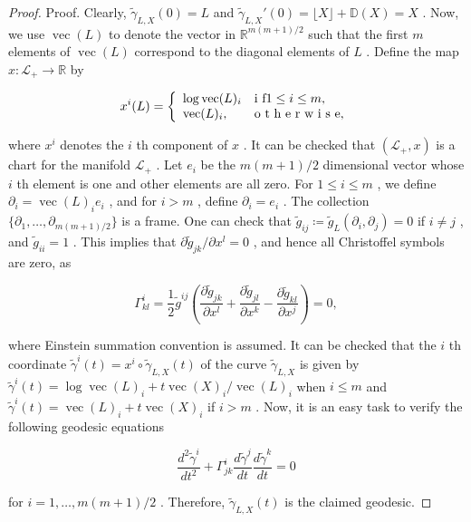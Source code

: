\documentclass[11pt]{article}
\begin{document}
\begin{proof}
Proof. Clearly,  $\tilde{\gamma}_{L,X}(0) = L$  and  $\tilde{\gamma}_{L,X}'(0) = \lfloor X\rfloor +\mathbb{D}(X) = X$ . Now, we use  $\operatorname{vec}(L)$  to denote the vector in  $\mathbb{R}^{m(m+1)/2}$  such that the first  $m$  elements of  $\operatorname{vec}(L)$  correspond to the diagonal elements of  $L$ . Define the map  $x:\mathcal{L}_+\to \mathbb{R}$  by

$$
x ^ {i} (L) = \left\{ \begin{array}{l l} \log \operatorname {v e c} (L) _ {i} & \text {i f} 1 \leq i \leq m, \\ \operatorname {v e c} (L) _ {i}, & \text {o t h e r w i s e}, \end{array} \right.
$$

where  $x^{i}$  denotes the  $i$ th component of  $x$ . It can be checked that  $(\mathcal{L}_{+},x)$  is a chart for the manifold  $\mathcal{L}_{+}$ . Let  $e_{i}$  be the  $m(m + 1) / 2$  dimensional vector whose  $i$ th element is one and other elements are all zero. For  $1\leq i\leq m$ , we define  $\partial_i = \operatorname {vec}(L)_ie_i$ , and for  $i > m$ , define  $\partial_i = e_i$ . The collection  $\{\partial_1,\dots ,\partial_{m(m + 1) / 2}\}$  is a frame. One can check that  $\tilde{g}_{ij}\coloneqq \tilde{g}_L(\partial_i,\partial_j) = 0$  if  $i\neq j$ , and  $\tilde{g}_{ii} = 1$ . This implies that  $\partial \tilde{g}_{jk} / \partial x^l = 0$ , and hence all Christoffel symbols are zero, as

$$
\Gamma_ {k l} ^ {i} = \frac {1}{2} \tilde {g} ^ {i j} \left(\frac {\partial \tilde {g} _ {j k}}{\partial x ^ {l}} + \frac {\partial \tilde {g} _ {j l}}{\partial x ^ {k}} - \frac {\partial \tilde {g} _ {k l}}{\partial x ^ {j}}\right) = 0,
$$

where Einstein summation convention is assumed. It can be checked that the  $i$ th coordinate  $\tilde{\gamma}^i(t) = x^i \circ \tilde{\gamma}_{L,X}(t)$  of the curve  $\tilde{\gamma}_{L,X}$  is given by  $\tilde{\gamma}^i(t) = \log \operatorname{vec}(L)_i + t\operatorname{vec}(X)_i / \operatorname{vec}(L)_i$  when  $i \leq m$  and  $\tilde{\gamma}^i(t) = \operatorname{vec}(L)_i + t\operatorname{vec}(X)_i$  if  $i > m$ . Now, it is an easy task to verify the following geodesic equations

$$
\frac {d ^ {2} \tilde {\gamma} ^ {i}}{d t ^ {2}} + \Gamma_ {j k} ^ {i} \frac {d \tilde {\gamma} ^ {j}}{d t} \frac {d \tilde {\gamma} ^ {k}}{d t} = 0
$$

for  $i = 1, \dots, m(m + 1) / 2$ . Therefore,  $\tilde{\gamma}_{L,X}(t)$  is the claimed geodesic.


\end{proof}
\end{document}
